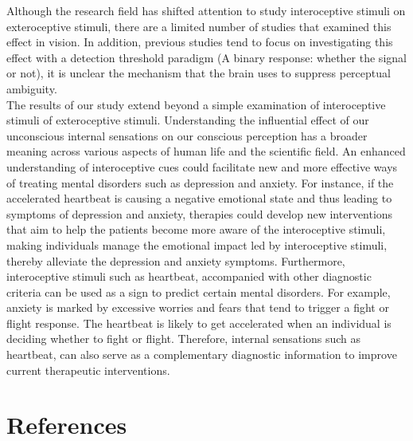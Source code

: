 \documentclass[
  man]{apa6}
\begin{document}
Although the research field has shifted attention to study interoceptive stimuli on exteroceptive stimuli, there are a limited number of studies that examined this effect in vision. In addition, previous studies tend to focus on investigating this effect with a detection threshold paradigm (A binary response: whether the signal or not), it is unclear the mechanism that the brain uses to suppress perceptual ambiguity.\\
The results of our study extend beyond a simple examination of interoceptive stimuli of exteroceptive stimuli. Understanding the influential effect of our unconscious internal sensations on our conscious perception has a broader meaning across various aspects of human life and the scientific field. An enhanced understanding of interoceptive cues could facilitate new and more effective ways of treating mental disorders such as depression and anxiety. For instance, if the accelerated heartbeat is causing a negative emotional state and thus leading to symptoms of depression and anxiety, therapies could develop new interventions that aim to help the patients become more aware of the interoceptive stimuli, making individuals manage the emotional impact led by interoceptive stimuli, thereby alleviate the depression and anxiety symptoms. Furthermore, interoceptive stimuli such as heartbeat, accompanied with other diagnostic criteria can be used as a sign to predict certain mental disorders. For example, anxiety is marked by excessive worries and fears that tend to trigger a fight or flight response. The heartbeat is likely to get accelerated when an individual is deciding whether to fight or flight. Therefore, internal sensations such as heartbeat, can also serve as a complementary diagnostic information to improve current therapeutic interventions.

\newpage

\hypertarget{references}{%
\section*{References}\label{references}}
\end{document}
